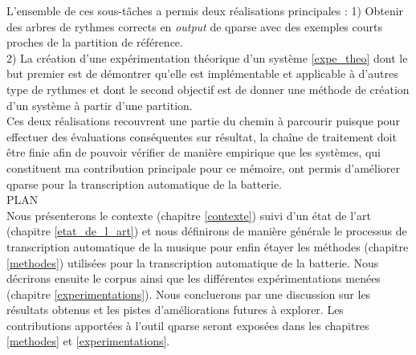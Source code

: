 L’ensemble de ces sous-tâches a permis deux réalisations principales :
1) Obtenir des arbres de rythmes corrects en \textit{output} de qparse avec des
exemples courts proches de la partition de référence. \\
2) La création d’une expérimentation théorique d’un système \ref{expe_theo}
dont le but premier est de démontrer qu’elle est implémentable et applicable à
d’autres type de rythmes et dont le second objectif est de donner une méthode
de création d’un système à partir d’une partition.\\
Ces deux réalisations recouvrent une partie du chemin à parcourir puisque pour
effectuer des évaluations conséquentes sur résultat, la chaîne de traitement
doit être finie afin de pouvoir vérifier de manière empirique que les systèmes,
qui constituent ma contribution principale pour ce mémoire, ont permis
d’améliorer qparse pour la transcription automatique de la batterie.\\

PLAN\\
Nous présenterons le contexte (chapitre \ref{contexte}) suivi d’un état de l’art
(chapitre \ref{etat_de_l_art}) et nous définirons de manière générale le
processus de transcription automatique de la musique pour enfin étayer les
méthodes (chapitre \ref{methodes}) utilisées pour la transcription automatique
de la batterie.  Nous décrirons ensuite le corpus ainsi que les différentes
expérimentations menées (chapitre \ref{experimentations}). Nous concluerons par
une discussion sur les résultats obtenus et les pistes d’améliorations futures
à explorer. Les contributions apportées à l’outil qparse seront exposées dans
les chapitres \ref{methodes} et \ref{experimentations}.
